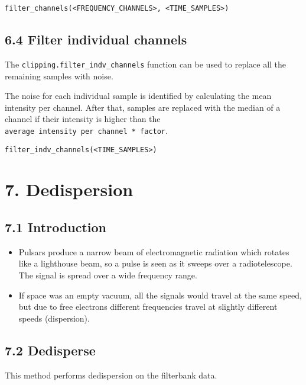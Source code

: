 \documentclass[]{article}
\begin{document}
\begin{verbatim}
filter_channels(<FREQUENCY_CHANNELS>, <TIME_SAMPLES>)
\end{verbatim}

\subsection{6.4 Filter individual
channels}\label{filter-individual-channels}

The \texttt{clipping.filter\_indv\_channels} function can be used to
replace all the remaining samples with noise.

The noise for each individual sample is identified by calculating the
mean intensity per channel. After that, samples are replaced with the
median of a channel if their intensity is higher than the
\texttt{average\ intensity\ per\ channel\ *\ factor}.

\begin{verbatim}
filter_indv_channels(<TIME_SAMPLES>)
\end{verbatim}

\section{7. Dedispersion}\label{dedispersion}

\subsection{7.1 Introduction}\label{introduction}

\begin{itemize}
\item
  Pulsars produce a narrow beam of electromagnetic radiation which
  rotates like a lighthouse beam, so a pulse is seen as it sweeps over a
  radiotelescope. The signal is spread over a wide frequency range.
\item
  If space was an empty vacuum, all the signals would travel at the same
  speed, but due to free electrons different frequencies travel at
  slightly different speeds (dispersion).
\end{itemize}

\subsection{7.2 Dedisperse}\label{dedisperse}

This method performs dedispersion on the filterbank data.
\end{document}
